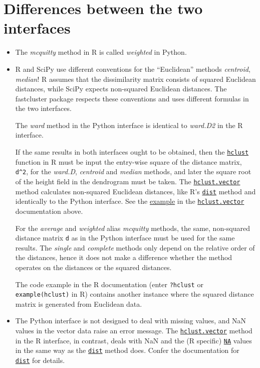 \documentclass[fontsize=10pt,paper=letter,BCOR=-6mm,DIV=8]{scrartcl}
\newcommand*\q{\textquotesingle}
\newcommand*\dist{\href{https://stat.ethz.ch/R-manual/R-patched/library/stats/html/dist.html}{\texttt{dist}}}
\newcommand*\NA{\href{https://stat.ethz.ch/R-manual/R-patched/library/base/html/NA.html}{\texttt{NA}}}
\begin{document}
\section{Differences between the two interfaces}
\begin{itemize}
\item The \textit{\q mcquitty\q} method in R is called \textit{\q weighted\q} in Python.
\item R and SciPy use different conventions for the ``Euclidean'' methods \textit{\q centroid\q}, \textit{\q median\q}! R assumes that the dissimilarity matrix consists of squared Euclidean distances, while SciPy expects non-squared Euclidean distances. The fastcluster package respects these conventions and uses different formulas in the two interfaces.

The \textit{\q ward\q} method in the Python interface is identical to \textit{\q ward.D2\q} in the R interface.

If the same results in both interfaces ought to be obtained, then the \hyperref[hclust]{\texttt{hclust}} function in R must be input the entry-wise square of the distance matrix, \verb!d^2!, for the \textit{\q ward.D\q}, \textit{\q centroid\q} and \textit{\q median\q} methods, and later the square root of the height field in the dendrogram must be taken. The \hyperref[hclust.vector]{\texttt{hclust.vector}} method calculates non-squared Euclidean distances, like R's \dist{} method and identically to the Python interface. See the \hyperref[squared]{example} in the \hyperref[hclust.vector]{\texttt{hclust.vector}} documentation above.

For the \textit{\q average\q} and \textit{\q weighted\q} alias \textit{\q mcquitty\q} methods, the same, non-squared distance matrix \texttt{d} as in the Python interface must be used for the same results. The \textit{\q single\q} and \textit{\q complete\q} methods only depend on the relative order of the distances, hence it does not make a difference whether the method operates on the distances or the squared distances.

The code example in the R documentation (enter \texttt{?hclust} or \texttt{ex\-am\-ple(hclust)} in R) contains another instance where the squared distance matrix is generated from Euclidean data.

\item The Python interface is not designed to deal with missing values, and NaN values in the vector data raise an error message. The \hyperref[hclust.vector]{\texttt{hclust.vector}} method in the R interface, in contrast, deals with NaN and the (R specific) {\NA} values in the same way as the \dist{} method does. Confer the documentation for \dist{} for details.
\end{itemize}
\end{document}
